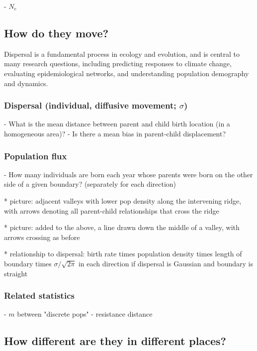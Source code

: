 \documentclass{ar-1col}
\begin{document}
        - $N_e$

\subsection{How do they move?}
Dispersal is a fundamental process in ecology and evolution, 
and is central to many research questions, 
including predicting responses to climate change,
evaluating epidemiological networks, 
and understanding population demography and dynamics.

\subsubsection{Dispersal (individual, diffusive movement; $\sigma$)}

        - What is the mean distance between parent and child birth location (in a homogeneous area)?
        - Is there a mean bias in parent-child displacement?

\subsubsection{Population flux}

        - How many individuals are born each year whose parents were born on the other side of a given boundary?
            (separately for each direction)

            * picture: adjacent valleys with lower pop density along the intervening ridge,
                with arrows denoting all parent-child relationships that cross the ridge 

            * picture: added to the above, a line drawn down the middle of a valley, with arrows crossing as before

            * relationship to dispersal: birth rate times population density times length of boundary times $\sigma/\sqrt{2\pi}$ in each direction 
                if dispersal is Gaussian and boundary is straight

\subsubsection{Related statistics}

        - $m$ between "discrete pops"
        - resistance distance


\subsection{How different are they in different places?}
\end{document}
